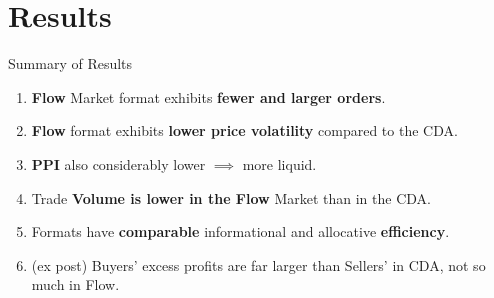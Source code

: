 \documentclass[10pt]{beamer}
\begin{document}
\section{Results}

\begin{frame}{Summary of Results}

\begin{enumerate}
    \item[R1:] \textbf{Flow} Market format exhibits \textbf{fewer and larger orders}.  \pause 

    
    \item[R2:] \textbf{Flow} format exhibits \textbf{lower price volatility} compared to the CDA.\\  \pause 
   
     \item[R3:] \textbf{PPI} also considerably lower $\implies$ more liquid. \\  \pause 
    \vspace{0.5cm}
    
    \item[R4:] Trade \textbf{Volume is lower in the Flow} Market than in the CDA.  \pause 
    
    \item[R5:] Formats have \textbf{comparable} informational and allocative \textbf{efficiency}. \pause 
  \vspace{0.5cm}
    \item[R6:] (ex post) Buyers' excess profits are far larger than Sellers' in CDA, not so much in Flow. 
    
\end{enumerate}



\end{frame}
\end{document}
